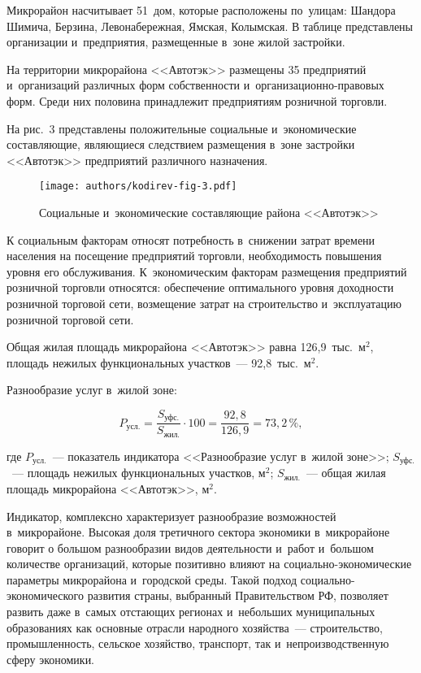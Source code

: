 

Микрорайон насчитывает 51~дом, которые расположены по~улицам: Шандора Шимича, Берзина, Левонабережная, Ямская, Колымская. В таблице представлены организации и~предприятия, размещенные в~зоне жилой застройки.



На территории микрорайона <<Автотэк>> размещены 35 предприятий и~организаций различных форм собственности и~организационно-правовых форм. Среди них половина принадлежит предприятиям розничной торговли.

На рис.~3 представлены положительные социальные и~экономические составляющие, являющиеся следствием размещения в~зоне застройки <<Автотэк>> предприятий различного назначения.\enlargethispage{\baselineskip}

\begin{figure}[]
  \centering
  \texttt{[image: authors/kodirev-fig-3.pdf]}
  \caption{Социальные и~экономические составляющие района <<Автотэк>>}
  \label{fig:kodirev-fig-3}
  \vspace{-8pt}
\end{figure}

К социальным факторам относят потребность в~снижении затрат времени населения на посещение предприятий торговли, необходимость повышения уровня его обслуживания. К~экономическим факторам размещения предприятий розничной торговли относятся: обеспечение оптимального уровня доходности розничной торговой сети, возмещение затрат на строительство и~эксплуатацию розничной торговой сети.

Общая жилая площадь микрорайона <<Автотэк>> равна 126,9~тыс.~м$^2$, площадь нежилых функциональных участков~--- 92,8~тыс.~м$^2$.


Разнообразие услуг в~жилой зоне:

$$ P_{\text{усл.}} = \frac{S_{\text{уфс.}}}{S_{\text{жил.}}}\cdot100 = \frac{92,8}{126,9} = 73,2\,\%,$$

где $P_{\text{усл.}}$~--- показатель индикатора <<Разнообразие услуг в~жилой зоне>>;
$S_{\text{уфс.}}$~--- площадь нежилых функциональных участков, м$^2$;
$S_{\text{жил.}}$~--- общая жилая площадь микрорайона <<Автотэк>>, м$^2$.

Индикатор, комплексно характеризует разнообразие возможностей в~микрорайоне. Высокая доля третичного сектора экономики в~микрорайоне говорит о большом разнообразии видов деятельности и~работ и~большом количестве организаций, которые позитивно влияют на социально-экономические параметры микрорайона и~городской среды. Такой подход социально-экономического развития страны, выбранный Правительством РФ, позволяет развить даже в~самых отстающих регионах и~небольших муниципальных образованиях как основные отрасли народного хозяйства~--- строительство, промышленность, сельское хозяйство, транспорт, так и~непроизводственную сферу экономики.

